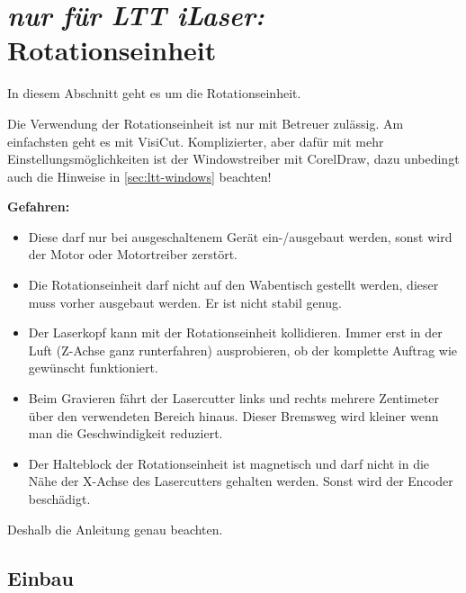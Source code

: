 \documentclass{\basedir/fablab-document}
\newcommand{\nurLTT}{\emph{nur für LTT iLaser:} }
\begin{document}
	\section{\nurLTT Rotationseinheit}
	In diesem Abschnitt geht es um die Rotationseinheit.

	 Die Verwendung der Rotationseinheit ist nur mit Betreuer zulässig.
	 Am einfachsten geht es mit VisiCut. Komplizierter, aber dafür mit mehr Einstellungsmöglichkeiten ist der Windowstreiber mit CorelDraw, dazu unbedingt auch die Hinweise in \cref{sec:ltt-windows} beachten!

	\textbf{Gefahren:}
	\begin{itemize}
		\item Diese darf nur bei ausgeschaltenem Gerät ein-/ausgebaut werden, sonst wird der Motor oder Motortreiber zerstört.
		\item Die Rotationseinheit darf nicht auf den Wabentisch gestellt werden, dieser muss vorher ausgebaut werden. Er ist nicht stabil genug.
		\item Der Laserkopf kann mit der Rotationseinheit kollidieren. Immer erst in der Luft (Z-Achse ganz runterfahren) ausprobieren, ob der komplette Auftrag wie gewünscht funktioniert.
		\item Beim Gravieren fährt der Lasercutter links und rechts mehrere Zentimeter über den verwendeten Bereich hinaus. Dieser Bremsweg wird kleiner wenn man die Geschwindigkeit reduziert.
		\item Der Halteblock der Rotationseinheit ist magnetisch und darf nicht in die Nähe der X-Achse des Lasercutters gehalten werden. Sonst wird der Encoder beschädigt.
	\end{itemize}
	Deshalb die Anleitung genau beachten.

	\subsection{Einbau}
\end{document}
